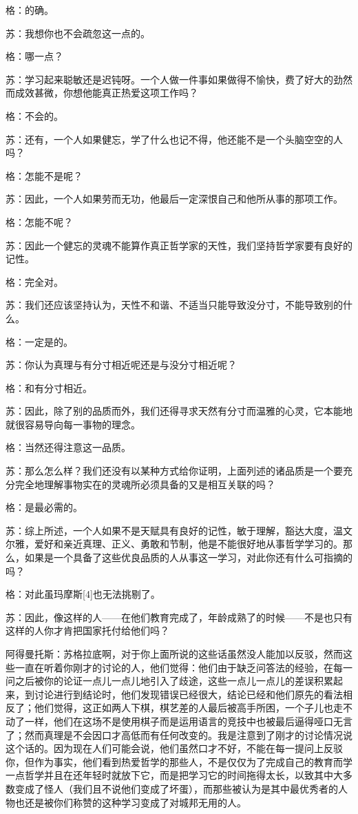 \documentclass[12pt,oneside]{book}
\begin{document}
格：的确。

苏：我想你也不会疏忽这一点的。

格：哪一点？

苏：学习起来聪敏还是迟钝呀。一个人做一件事如果做得不愉快，费了好大的劲然而成效甚微，你想他能真正热爱这项工作吗？

格：不会的。

苏：还有，一个人如果健忘，学了什么也记不得，他还能不是一个头脑空空的人吗？

格：怎能不是呢？

苏：因此，一个人如果劳而无功，他最后一定深恨自己和他所从事的那项工作。

格：怎能不呢？

苏：因此一个健忘的灵魂不能算作真正哲学家的天性，我们坚持哲学家要有良好的记性。

格：完全对。

苏：我们还应该坚持认为，天性不和谐、不适当只能导致没分寸，不能导致别的什么。

格：一定是的。

苏：你认为真理与有分寸相近呢还是与没分寸相近呢？

格：和有分寸相近。

苏：因此，除了别的品质而外，我们还得寻求天然有分寸而温雅的心灵，它本能地就很容易导向每一事物的理念。

格：当然还得注意这一品质。

苏：那么怎么样？我们还没有以某种方式给你证明，上面列述的诸品质是一个要充分完全地理解事物实在的灵魂所必须具备的又是相互关联的吗？

格：是最必需的。

苏：综上所述，一个人如果不是天赋具有良好的记性，敏于理解，豁达大度，温文尔雅，爱好和亲近真理、正义、勇敢和节制，他是不能很好地从事哲学学习的。那么，如果是一个具备了这些优良品质的人从事这一学习，对此你还有什么可指摘的吗？

格：对此虽玛摩斯[4]也无法挑剔了。

苏：因此，像这样的人——在他们教育完成了，年龄成熟了的时候——不是也只有这样的人你才肯把国家托付给他们吗？

阿得曼托斯：苏格拉底啊，对于你上面所说的这些话虽然没人能加以反驳，然而这些一直在听着你刚才的讨论的人，他们觉得：他们由于缺乏问答法的经验，在每一问之后被你的论证一点儿一点儿地引入了歧途，这些一点儿一点儿的差误积累起来，到讨论进行到结论时，他们发现错误已经很大，结论已经和他们原先的看法相反了；他们觉得，这正如两人下棋，棋艺差的人最后被高手所困，一个子儿也走不动了一样，他们在这场不是使用棋子而是运用语言的竞技中也被最后逼得哑口无言了；然而真理是不会因口才高低而有任何改变的。我是注意到了刚才的讨论情况说这个话的。因为现在人们可能会说，他们虽然口才不好，不能在每一提问上反驳你，但作为事实，他们看到热爱哲学的那些人，不是仅仅为了完成自己的教育而学一点哲学并且在还年轻时就放下它，而是把学习它的时间拖得太长，以致其中大多数变成了怪人（我们且不说他们变成了坏蛋），而那些被认为是其中最优秀者的人物也还是被你们称赞的这种学习变成了对城邦无用的人。
\end{document}
